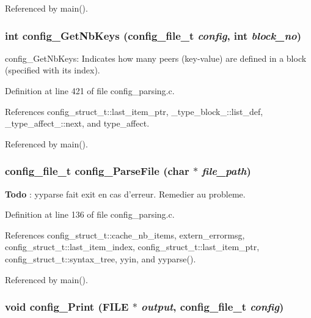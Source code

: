 Referenced by main().
\subsubsection{\setlength{\rightskip}{0pt plus 5cm}int config\_\-Get\-Nb\-Keys (config\_\-file\_\-t {\em config}, int {\em block\_\-no})}\label{config__parsing_8c_a14}


config\_\-Get\-Nb\-Keys: Indicates how many peers (key-value) are defined in a block (specified with its index). 

Definition at line 421 of file config\_\-parsing.c.

References config\_\-struct\_\-t::last\_\-item\_\-ptr, \_\-type\_\-block\_\-::list\_\-def, \_\-type\_\-affect\_\-::next, and type\_\-affect.

Referenced by main().
\subsubsection{\setlength{\rightskip}{0pt plus 5cm}config\_\-file\_\-t config\_\-Parse\-File (char $\ast$ {\em file\_\-path})}\label{config__parsing_8c_a6}


\begin{Desc}
\item[{\bf Todo}]: yyparse fait exit en cas d'erreur. Remedier au probleme.\end{Desc}


Definition at line 136 of file config\_\-parsing.c.

References config\_\-struct\_\-t::cache\_\-nb\_\-items, extern\_\-errormsg, config\_\-struct\_\-t::last\_\-item\_\-index, config\_\-struct\_\-t::last\_\-item\_\-ptr, config\_\-struct\_\-t::syntax\_\-tree, yyin, and yyparse().

Referenced by main().
\subsubsection{\setlength{\rightskip}{0pt plus 5cm}void config\_\-Print (FILE $\ast$ {\em output}, config\_\-file\_\-t {\em config})}\label{config__parsing_8c_a8}


